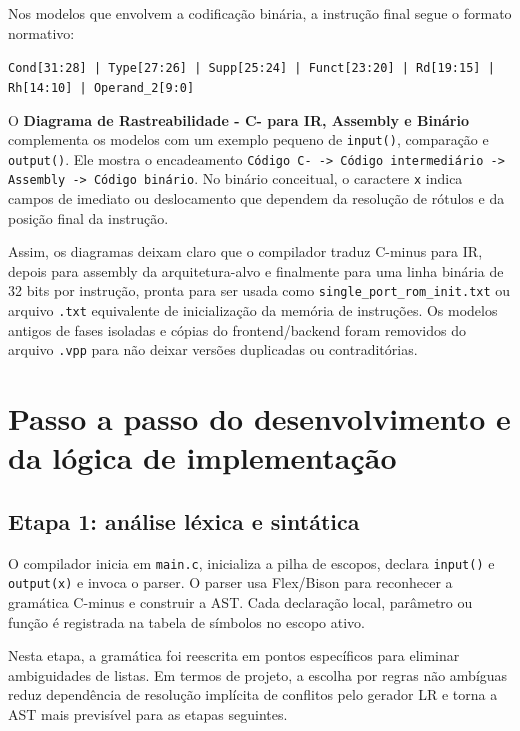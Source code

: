 \documentclass[12pt,a4paper]{article}
\begin{document}
Nos modelos que envolvem a codificação binária, a instrução final segue o formato normativo:
\begin{center}
\texttt{Cond[31:28] | Type[27:26] | Supp[25:24] | Funct[23:20] | Rd[19:15] | Rh[14:10] | Operand\_2[9:0]}
\end{center}

O \textbf{Diagrama de Rastreabilidade - C- para IR, Assembly e Binário} complementa os modelos com um exemplo pequeno de \texttt{input()}, comparação e \texttt{output()}. Ele mostra o encadeamento \texttt{Código C- -> Código intermediário -> Assembly -> Código binário}. No binário conceitual, o caractere \texttt{x} indica campos de imediato ou deslocamento que dependem da resolução de rótulos e da posição final da instrução.

Assim, os diagramas deixam claro que o compilador traduz C-minus para IR, depois para assembly da arquitetura-alvo e finalmente para uma linha binária de 32 bits por instrução, pronta para ser usada como \texttt{single\_port\_rom\_init.txt} ou arquivo \texttt{.txt} equivalente de inicialização da memória de instruções. Os modelos antigos de fases isoladas e cópias do frontend/backend foram removidos do arquivo \texttt{.vpp} para não deixar versões duplicadas ou contraditórias.

\section{Passo a passo do desenvolvimento e da lógica de implementação}
\subsection{Etapa 1: análise léxica e sintática}
O compilador inicia em \texttt{main.c}, inicializa a pilha de escopos, declara \texttt{input()} e \texttt{output(x)} e invoca o parser. O parser usa Flex/Bison para reconhecer a gramática C-minus e construir a AST. Cada declaração local, parâmetro ou função é registrada na tabela de símbolos no escopo ativo.

Nesta etapa, a gramática foi reescrita em pontos específicos para eliminar ambiguidades de listas. Em termos de projeto, a escolha por regras não ambíguas reduz dependência de resolução implícita de conflitos pelo gerador LR e torna a AST mais previsível para as etapas seguintes.
\end{document}
